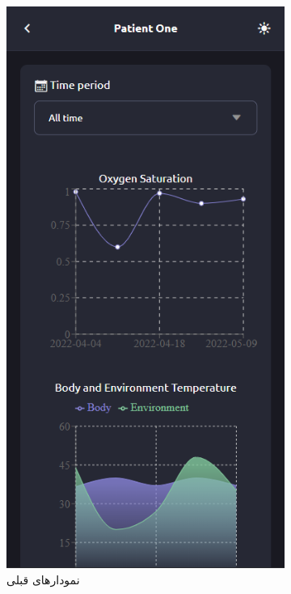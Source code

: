 \documentclass[12pt]{article}
\begin{document}
\begin{figure}
\begin{center}
\begin{subfigure}{.3\textwidth}
			\includegraphics[width=.9\linewidth]{app_charts1}
			\caption{نمودارهای قبلی}
			\label{old_charts}
		\end{subfigure}
		\begin{subfigure}{.3\textwidth}

\end{subfigure}
\end{center}
\end{figure}
\end{document}
